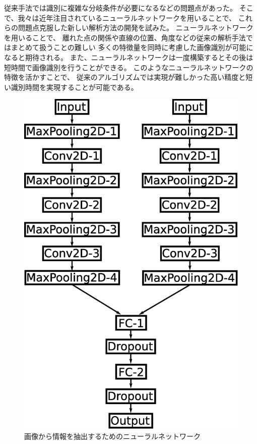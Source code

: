 \documentclass{jps-cp}
\begin{document}
従来手法では識別に複雑な分岐条件が必要になるなどの問題点があった。
そこで、我々は近年注目されているニューラルネットワークを用いることで、
これらの問題点克服した新しい解析方法の開発を試みた。
ニューラルネットワークを用いることで、
離れた点の関係や直線の位置、角度などの従来の解析手法ではまとめて扱うことの難しい
多くの特徴量を同時に考慮した画像識別が可能になると期待される。
また、ニューラルネットワークは一度構築するとその後は短時間で画像識別を行うことができる。
このようなニューラルネットワークの特徴を活かすことで、
従来のアルゴリズムでは実現が難しかった高い精度と短い識別時間を実現することが可能である。

\begin{figure}
  \centering
  \includegraphics[clip, width=15zw]{eps/point_detection.eps}
  \caption{画像から情報を抽出するためのニューラルネットワーク}
  \label{fig:extraction}
\end{figure}
\end{document}
